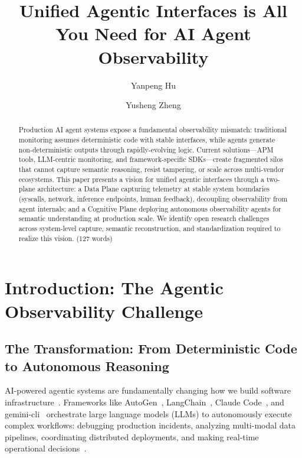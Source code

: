 \documentclass[sigplan,screen,9pt]{acmart}
\begin{document}
\title{Unified Agentic Interfaces is All You Need for AI Agent Observability}

\author{Yanpeng Hu}

\author{Yusheng Zheng}


\sloppy
\begin{abstract}
Production AI agent systems expose a fundamental observability mismatch: traditional monitoring assumes deterministic code with stable interfaces, while agents generate non-deterministic outputs through rapidly-evolving logic. Current solutions—APM tools, LLM-centric monitoring, and framework-specific SDKs—create fragmented silos that cannot capture semantic reasoning, resist tampering, or scale across multi-vendor ecosystems. This paper presents a vision for unified agentic interfaces through a two-plane architecture: a Data Plane capturing telemetry at stable system boundaries (syscalls, network, inference endpoints, human feedback), decoupling observability from agent internals; and a Cognitive Plane deploying autonomous observability agents for semantic understanding at production scale. We identify open research challenges across system-level capture, semantic reconstruction, and standardization required to realize this vision. (127 words)
\end{abstract}


\maketitle



\section{Introduction: The Agentic Observability Challenge}

\subsection{The Transformation: From Deterministic Code to Autonomous Reasoning}

AI-powered agentic systems are fundamentally changing how we build software infrastructure~\cite{wang2024survey,guo2024survey}. Frameworks like AutoGen~\cite{autogen}, LangChain~\cite{langchain}, Claude Code~\cite{claudecode}, and gemini-cli~\cite{geminicli} orchestrate large language models (LLMs) to autonomously execute complex workflows: debugging production incidents, analyzing multi-modal data pipelines, coordinating distributed deployments, and making real-time operational decisions~\cite{tran2025survey}.
\end{document}
